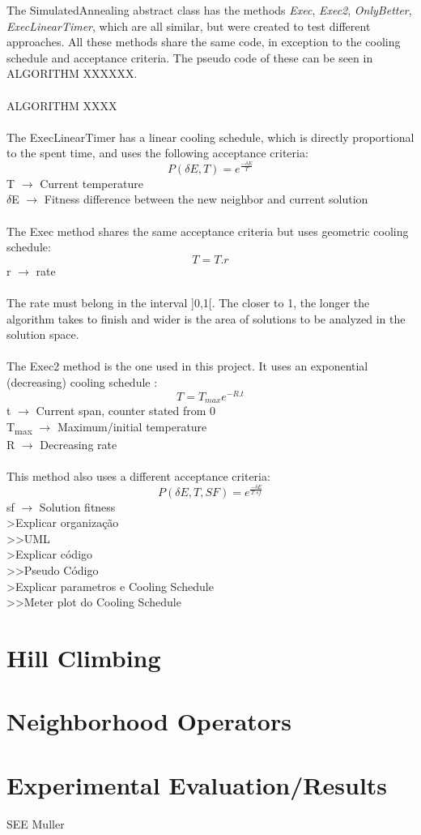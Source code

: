 The SimulatedAnnealing abstract class has the methods \textit{Exec}, \textit{Exec2}, \textit{OnlyBetter}, \textit{ExecLinearTimer}, which are all similar, but were created to test different approaches. All these methods share the same code, in exception to the cooling schedule and acceptance criteria. The pseudo code of these can be seen in ALGORITHM XXXXXX.\\
\\
ALGORITHM XXXX\\
\\
The ExecLinearTimer has a linear cooling schedule, which is directly proportional to the spent time, and uses the following acceptance criteria:\\
\[P(\delta E, T) = e^{\frac{-\delta E}{T}} \]
T $\rightarrow$ Current temperature\\
$\delta$E $\rightarrow$ Fitness difference between the new neighbor and current solution\\
\\
The Exec method shares the same acceptance criteria but uses geometric cooling schedule:\\
\[T = T.r \]
r $\rightarrow$ rate\\
\\
The rate must belong in the interval ]0,1[. The closer to 1, the longer the algorithm takes to finish and wider is the area of solutions to be analyzed in the solution space.\\
\\
The Exec2 method is the one used in this project. It uses an exponential (decreasing) cooling schedule \cite{CarvalhoLisbonNovember2004}:\\
\[T = T_{max}e^{-R.t} \]
t $\rightarrow$ Current span, counter stated from 0\\
T\textsubscript{max} $\rightarrow$ Maximum/initial temperature\\
R $\rightarrow$ Decreasing rate\\
\\
This method also uses a different acceptance criteria:\\
\[P(\delta E, T, SF) = e^{\frac{-\delta E}{T.sf}} \]
sf $\rightarrow$ Solution fitness\\

>Explicar organização\\
>>UML\\
>Explicar código\\
>>Pseudo Código\\
>Explicar parametros e Cooling Schedule\\
>>Meter plot do Cooling Schedule



\section{Hill Climbing}
\label{sec:HillClimbing}

\section{Neighborhood Operators}
\label{sec:NeighborhoodOperators}

\section{Experimental Evaluation/Results}

SEE Muller

